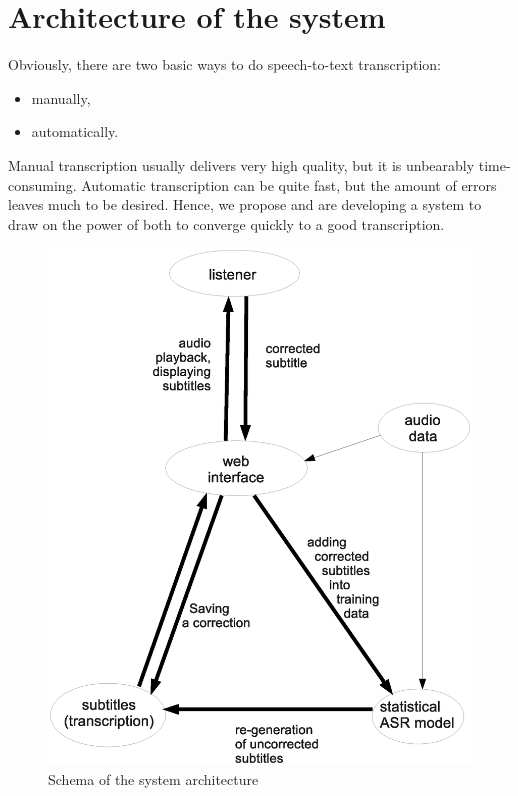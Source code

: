 \documentclass{llncs}
\begin{document}
\section{Architecture of the system}

Obviously, there are two basic ways to do speech-to-text transcription:
\begin{itemize}
\item{manually,}
\item{automatically.}
\end{itemize}
Manual transcription usually delivers very high quality, but it is unbearably
time-consuming. Automatic transcription can be quite fast, but the amount of
errors leaves much to be desired. Hence, we propose and are developing a system
to draw on the power of both to converge quickly to a good transcription.

\begin{figure}[htpb]
\includegraphics[scale=0.6]{arch.eps}
\caption{Schema of the system architecture}
\label{fig:arch}
\end{figure}
\end{document}
